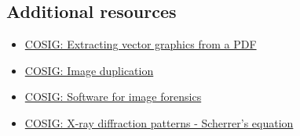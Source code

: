 \documentclass[letterpaper, 12pt]{article}
\begin{document}
\subsection*{Additional resources}

\begin{itemize}
    \setlength\itemsep{-0.5em}
    \item \href{https://osf.io/n8fvw}{COSIG: Extracting vector graphics from a PDF}
    \item \href{https://osf.io/547re}{COSIG: Image duplication}
    \item \href{https://osf.io/g23pf}{COSIG: Software for image forensics}
    \item \href{https://osf.io/hf7qy}{COSIG: X-ray diffraction patterns - Scherrer's equation}
\end{itemize}

\end{document}
